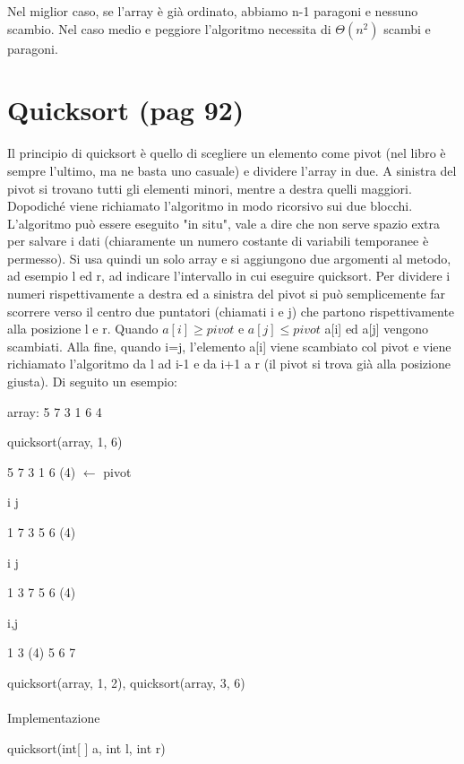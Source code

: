 \documentclass[12pt,a4paper]{book}
\begin{document}
Nel miglior caso, se l'array è già ordinato, abbiamo n-1 paragoni e nessuno scambio. Nel caso medio e peggiore l'algoritmo necessita di $\Theta (n^2)$ scambi e paragoni.

\section{Quicksort (pag 92)}
Il principio di quicksort è quello di scegliere un elemento come pivot (nel libro è sempre l'ultimo, ma ne basta uno casuale) e dividere l'array in due. A sinistra del pivot si trovano tutti gli elementi minori, mentre a destra quelli maggiori. Dopodiché viene richiamato l'algoritmo in modo ricorsivo sui due blocchi. L'algoritmo può essere eseguito "in situ", vale a dire che non serve spazio extra per salvare i dati (chiaramente un numero costante di variabili temporanee è permesso). Si usa quindi un solo array e si aggiungono due argomenti al metodo, ad esempio l ed r, ad indicare l'intervallo in cui eseguire quicksort. Per dividere i numeri rispettivamente a destra ed a sinistra del pivot si può semplicemente far scorrere verso il centro due puntatori (chiamati i e j) che partono rispettivamente alla posizione l e r. Quando $a[i] \geq pivot$ e $a[j] \leq pivot$ a[i] ed a[j] vengono scambiati. Alla fine, quando i=j, l'elemento a[i] viene scambiato col pivot e viene richiamato l'algoritmo da l ad i-1 e da i+1 a r (il pivot si trova già alla posizione giusta). Di seguito un esempio:

array: 5 7 3 1 6 4

quicksort(array, 1, 6)

5 7 3 1 6 (4) $\leftarrow$ pivot

i\hspace{2em}       j 

1 7 3 5 6 (4)

\hspace{0.8em}  i j
  
1 3 7 5 6 (4)

\hspace{1,3em}   i,j
   
1 3 (4) 5 6 7

quicksort(array, 1, 2), quicksort(array, 3, 6)
      
\paragraph{}Implementazione

quicksort(int[ ] a, int l, int r)
\end{document}
